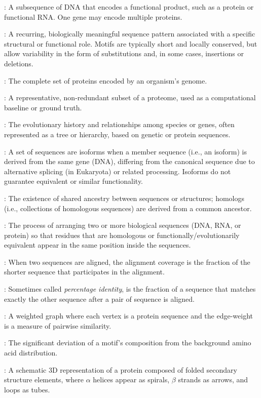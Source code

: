 \documentclass[a4paper,12pt]{extarticle}
\begin{document}
\begin{description}[leftmargin=1.2em]
    \item[Gene]: A subsequence of DNA that encodes a functional product, such as a protein or functional RNA. One gene may encode multiple proteins.
    \item[Motif]: A recurring, biologically meaningful sequence pattern associated with a specific structural or functional role. Motifs are typically short and locally conserved, but allow variability in the form of substitutions and, in some cases, insertions or deletions.
    \item[Proteome]: The complete set of proteins encoded by an organism's genome.  
    \item[Reference Proteome]: A representative, non-redundant subset of a proteome, used as a computational baseline or ground truth.
    \item[Phylogeny]: The evolutionary history and relationships among species or genes, often represented as a tree or hierarchy, based on genetic or protein sequences.
    \item[Isoforms]: A set of sequences are isoforms when a member sequence (i.e., an isoform) is derived from the same gene (DNA), differing from the canonical sequence due to alternative splicing (in Eukaryota) or related processing. Isoforms do not guarantee equivalent or similar functionality.
    \item[Homology]: The existence of shared ancestry between sequences or structures; homologs (i.e., collections of homologous sequences) are derived from a common ancestor.
    \item[Sequence Alignment]: The process of arranging two or more biological sequences (DNA, RNA, or protein) so that residues that are homologous or functionally/evolutionarily equivalent appear in the same position inside the sequences.
    \item[Alignment Coverage]: When two sequences are aligned, the alignment coverage is the fraction of the shorter sequence that participates in the alignment.
    \item[Sequence Identity]: Sometimes called \textit{percentage identity}, is the fraction of a sequence that matches exactly the other sequence after a pair of sequence is aligned.
    \item[Protein Sequence Similarity Network (PSSN)]: A weighted graph where each vertex is a protein sequence and the edge-weight is a measure of pairwise similarity.
    \item[Compositional Bias]: The significant deviation of a motif's composition from the background amino acid distribution.
    \item[Ribbon Diagram]: A schematic 3D representation of a protein composed of folded secondary structure elements, where \(\alpha\) helices appear as spirals, \(\beta\) strands as arrows, and loops as tubes.


\end{description}
\end{document}
